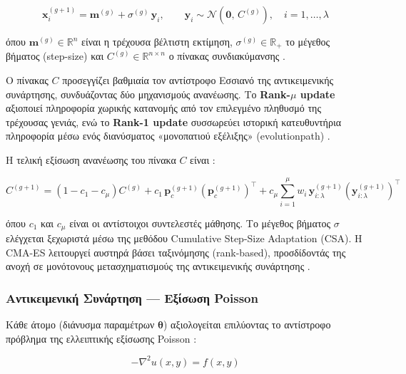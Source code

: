 \begin{equation}
  \mathbf{x}_i^{(g+1)} = \mathbf{m}^{(g)} + \sigma^{(g)}\,\mathbf{y}_i,
  \qquad \mathbf{y}_i \sim \mathcal{N}\!\left(\mathbf{0},\,C^{(g)}\right),
  \quad i = 1,\ldots,\lambda
\end{equation}

όπου $\mathbf{m}^{(g)}\in\mathbb{R}^n$ είναι η τρέχουσα βέλτιστη εκτίμηση, $\sigma^{(g)}\in\mathbb{R}_+$ το μέγεθος βήματος (step-size) και $C^{(g)}\in\mathbb{R}^{n\times n}$ ο πίνακας συνδιακύμανσης \cite{HansenGECCO2014,WikiCMAES}.

Ο πίνακας $C$ προσεγγίζει βαθμιαία τον αντίστροφο Εσσιανό της αντικειμενικής συνάρτησης, συνδυάζοντας δύο μηχανισμούς ανανέωσης. Το \textbf{Rank-$\mu$ update} αξιοποιεί πληροφορία χωρικής κατανομής από τον επιλεγμένο πληθυσμό της τρέχουσας γενιάς, ενώ το \textbf{Rank-1 update} συσσωρεύει ιστορική κατευθυντήρια πληροφορία μέσω ενός διανύσματος «μονοπατιού εξέλιξης» (evolutionpath) \cite{HansenPDF2016,HansenGECCO2014}.

Η τελική εξίσωση ανανέωσης του πίνακα $C$ είναι \cite{HansenGECCO2014}:

\begin{equation}
  C^{(g+1)} =
    \left(1 - c_1 - c_\mu\right)C^{(g)}
    + c_1\,\mathbf{p}_c^{(g+1)}\!\left(\mathbf{p}_c^{(g+1)}\right)^{\!\top}
    + c_\mu \sum_{i=1}^{\mu} w_i\,
      \mathbf{y}_{i:\lambda}^{(g+1)}\!\left(\mathbf{y}_{i:\lambda}^{(g+1)}\right)^{\!\top}
\end{equation}

όπου $c_1$ και $c_\mu$ είναι οι αντίστοιχοι συντελεστές μάθησης. Το μέγεθος βήματος $\sigma$ ελέγχεται ξεχωριστά μέσω της μεθόδου Cumulative Step-Size Adaptation (CSA). Η CMA-ES λειτουργεί αυστηρά βάσει ταξινόμησης (rank-based), προσδίδοντάς της ανοχή σε μονότονους μετασχηματισμούς της αντικειμενικής συνάρτησης \cite{HansenGECCO2014,WikiCMAES}.

\subsubsection{Αντικειμενική Συνάρτηση — Εξίσωση Poisson}

Κάθε άτομο (διάνυσμα παραμέτρων $\boldsymbol{\theta}$) αξιολογείται επιλύοντας το αντίστροφο πρόβλημα της ελλειπτικής εξίσωσης Poisson \cite{appcode}:

\begin{equation}
  -\nabla^2 u(x,y) = f(x,y)
\end{equation}

